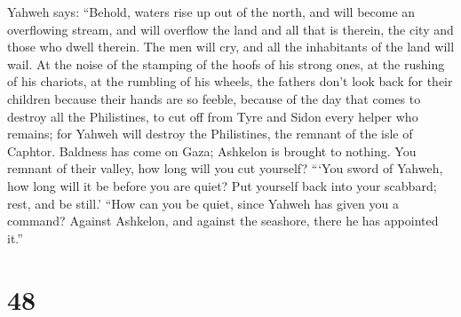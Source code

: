  Yahweh says: ``Behold, waters rise up out of the north,
and will become an overflowing stream, and will overflow the land and
all that is therein, the city and those who dwell therein. The men will
cry, and all the inhabitants of the land will wail.  At
the noise of the stamping of the hoofs of his strong ones, at the
rushing of his chariots, at the rumbling of his wheels, the fathers
don't look back for their children because their hands are so feeble,
 because of the day that comes to destroy all the
Philistines, to cut off from Tyre and Sidon every helper who remains;
for Yahweh will destroy the Philistines, the remnant of the isle of
Caphtor.  Baldness has come on Gaza; Ashkelon is brought
to nothing. You remnant of their valley, how long will you cut yourself?
 ```You sword of Yahweh, how long will it be before you
are quiet? Put yourself back into your scabbard; rest, and be still.'
 ``How can you be quiet, since Yahweh has given you a
command? Against Ashkelon, and against the seashore, there he has
appointed it.''

\hypertarget{section-47}{%
\section{48}\label{section-47}}

